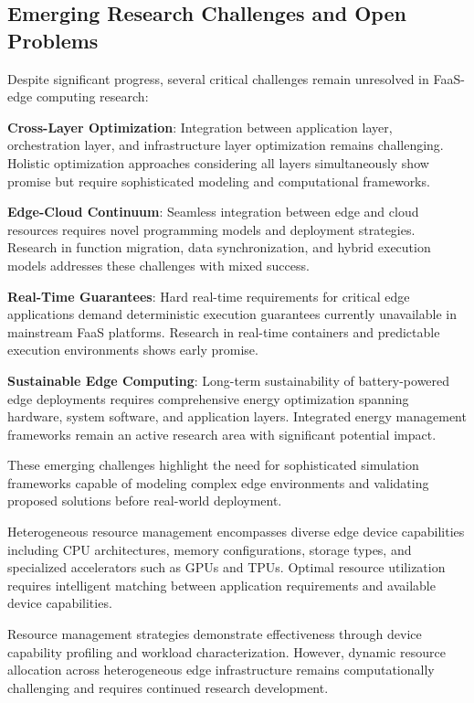 \subsection{Emerging Research Challenges and Open Problems}

Despite significant progress, several critical challenges remain unresolved in FaaS-edge computing research:

\textbf{Cross-Layer Optimization}: Integration between application layer, orchestration layer, and infrastructure layer optimization remains challenging. Holistic optimization approaches considering all layers simultaneously show promise but require sophisticated modeling and computational frameworks.

\textbf{Edge-Cloud Continuum}: Seamless integration between edge and cloud resources requires novel programming models and deployment strategies. Research in function migration, data synchronization, and hybrid execution models addresses these challenges with mixed success.

\textbf{Real-Time Guarantees}: Hard real-time requirements for critical edge applications demand deterministic execution guarantees currently unavailable in mainstream FaaS platforms. Research in real-time containers and predictable execution environments shows early promise.

\textbf{Sustainable Edge Computing}: Long-term sustainability of battery-powered edge deployments requires comprehensive energy optimization spanning hardware, system software, and application layers. Integrated energy management frameworks remain an active research area with significant potential impact.

These emerging challenges highlight the need for sophisticated simulation frameworks capable of modeling complex edge environments and validating proposed solutions before real-world deployment.

Heterogeneous resource management encompasses diverse edge device capabilities including CPU architectures, memory configurations, storage types, and specialized accelerators such as GPUs and TPUs. Optimal resource utilization requires intelligent matching between application requirements and available device capabilities.

Resource management strategies demonstrate effectiveness through device capability profiling and workload characterization. However, dynamic resource allocation across heterogeneous edge infrastructure remains computationally challenging and requires continued research development.

